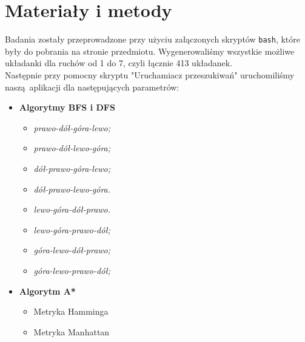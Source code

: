 \documentclass{classrep}
\begin{document}
\section{Materiały i metody}
Badania zostały przeprowadzone przy użyciu załączonych skryptów \texttt{bash}, które były do pobrania na stronie przedmiotu. Wygenerowaliśmy wszystkie możliwe układanki dla ruchów od 1 do 7, czyli łącznie 413 układanek.\\
Następnie przy pomocny skryptu "Uruchamiacz przeszukiwań" uruchomiliśmy naszą aplikacji dla następujących parametrów:\\
\begin{itemize}
	\item \textbf{Algorytmy BFS i DFS}
	\begin{itemize}
		\item \textit{prawo-dół-góra-lewo;}
		\item \textit{prawo-dół-lewo-góra;}
		\item \textit{dół-prawo-góra-lewo;}
		\item \textit{dół-prawo-lewo-góra.}
		\item \textit{lewo-góra-dół-prawo.}
		\item \textit{lewo-góra-prawo-dół;}
		\item \textit{góra-lewo-dół-prawo;}
		\item \textit{góra-lewo-prawo-dół;}
	\end{itemize}
	\item \textbf{Algorytm A*}
	\begin{itemize}
		\item{Metryka Hamminga}
		\item{Metryka Manhattan}
	\end{itemize}
\end{itemize}
\newpage

\setcounter{figure}{0}
\end{document}
